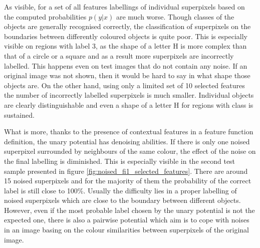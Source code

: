 As visible, for a set of all features labellings of individual superpixels based on the computed probabilities $p(y|x)$ are much worse. Though classes of the objects are generally recognised correctly, the classification of superpixels on the boundaries between differently coloured objects is quite poor. This is especially visible on regions with label 3, as the shape of a letter H is more complex than that of a circle or a square and as a result more superpixels are incorrectly labelled. This happens even on test images that do not contain any noise. If an original image was not shown, then it would be hard to say in what shape those objects are. On the other hand, using only a limited set of 10 selected features the number of incorrectly labelled superpixels is much smaller. Individual objects are clearly distinguishable and even a shape of a letter H for regions with  class is sustained.

What is more, thanks to the presence of contextual features in a feature function definition, the unary potential has denoising abilities. If there is only one noised superpixel surrounded by neighbours of the same colour, the effect of the noise on the final labelling is diminished. This is especially visible in the second test sample presented in figure \ref{fig:noised_fi1_selected_features}. There are around 15 noised superpixels and for the majority of them the probability of the correct label is still close to 100\%. Usually the difficulty lies in a proper labelling of noised superpixels which are close to the boundary between different objects. However, even if the most probable label chosen by the unary potential is not the expected one, there is also a pairwise potential which aim is to cope with noises in an image basing on the colour similarities between superpixels of the original image.

